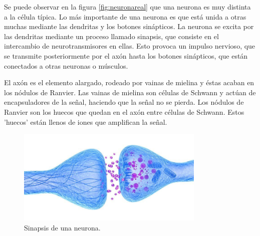\documentclass[12pt]{article}
\numberwithin{equation}{section}
\begin{document}
Se puede observar en la figura \ref{fig:neuronareal} que una neurona es muy distinta a la célula típica. Lo más importante de una neurona es que está unida a otras muchas mediante las dendritas y los botones sinápticos. La neurona se excita por las dendritas mediante un proceso llamado sinapsis, que consiste en el intercambio de neurotransmisores en ellas. Esto provoca un impulso nervioso, que se transmite posteriormente por el axón hasta los botones sinápticos, que están conectados a otras neuronas o músculos.

El axón es el elemento alargado, rodeado por vainas de mielina y éstas acaban en los nódulos de Ranvier. Las vainas de mielina son células de Schwann y actúan de encapsuladores de la señal, haciendo que la señal no se pierda. Los nódulos de Ranvier son los huecos que quedan en el axón entre células de Schwann. Estos 'huecos' están llenos de iones que amplifican la señal.

\begin{figure}[h]
    \centering
    \includegraphics[width=0.8\textwidth]{sinapsis.jpg}
    \caption{Sinapsis de una neurona.}
    \label{fig:mesh2}
\end{figure}
\end{document}
